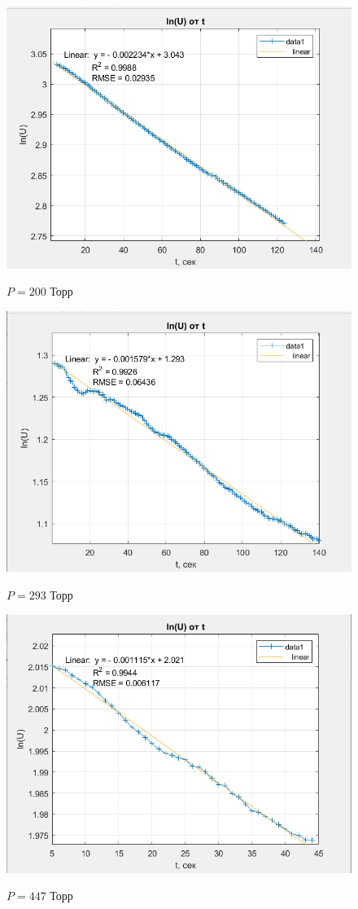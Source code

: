 \documentclass[a4paper, 12pt]{article} %
\begin{document}
\begin{figure}[h]
    \centering
    \includegraphics[width = 10.5 cm]{2gr200}
    \label{fig:vac}
    
    \begin{center}
        \caption{$P = 200$ Торр}
    \end{center}
\end{figure} 

\begin{figure}[h]
    \centering
    \includegraphics[width = 10.5 cm]{2gr293}
    \label{fig:vac}
    
    \begin{center}
        \caption{$P = 293$ Торр}
    \end{center}
\end{figure} 

\begin{figure}[h]
    \centering
    \includegraphics[width = 10.5 cm]{2gr447}
    \label{fig:vac}
    
    \begin{center}
        \caption{$P = 447$ Торр}
    \end{center}
\end{figure} 
\end{document}
